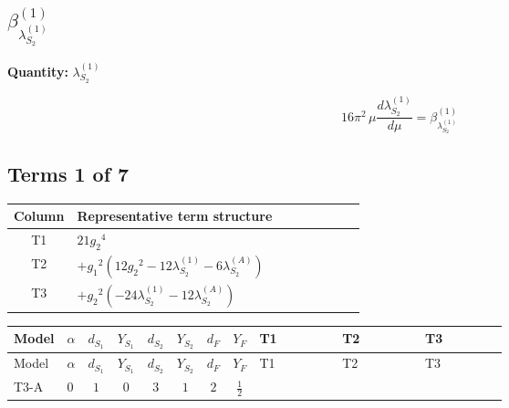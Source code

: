\documentclass[8pt]{article}
\begin{document}
\begin{landscape}
\section*{$\beta_{\lambda_{S_2}^{(1)}}^{(1)}$}
\noindent\textbf{Quantity: }$\lambda_{S_2}^{(1)}$\par\smallskip
\[16\pi^2\,\mu\frac{d \lambda_{S_2}^{(1)}}{d\mu}=\beta_{\lambda_{S_2}^{(1)}}^{(1)}\]
\subsection*{Terms 1 of 7}
\begin{center}
\begin{tabular}{@{}c >{\raggedright\arraybackslash}p{0.82\linewidth}@{}}
\toprule
Column & Representative term structure \\
\midrule
T1 & \(\displaystyle 21 {g_2}^4\) \\
\midrule
T2 & \(\displaystyle +{g_1}^2 \left(12 {g_2}^2-12 {\lambda_{S_2}^{(1)}}-6 {\lambda_{S_2}^{(A)}}\right)\) \\
\midrule
T3 & \(\displaystyle +{g_2}^2 (-24 {\lambda_{S_2}^{(1)}}-12 {\lambda_{S_2}^{(A)}})\) \\
\midrule
\bottomrule
\end{tabular}
\end{center}
\smallskip
\tiny
\begin{longtable}{@{}llcccccc >{\raggedright\arraybackslash}p{0.21\linewidth} >{\raggedright\arraybackslash}p{0.21\linewidth} >{\raggedright\arraybackslash}p{0.21\linewidth}@{}}
\toprule
Model & $\alpha$ & $d_{S_1}$ & $Y_{S_1}$ & $d_{S_2}$ & $Y_{S_2}$ & $d_F$ & $Y_F$ & T1 & T2 & T3 \\
\midrule
\endfirsthead
\toprule
Model & $\alpha$ & $d_{S_1}$ & $Y_{S_1}$ & $d_{S_2}$ & $Y_{S_2}$ & $d_F$ & $Y_F$ & T1 & T2 & T3 \\
\midrule
\endhead
T3-A & $0$ & $1$ & $0$ & $3$ & $1$ & $2$ & $\frac{1}{2}$ & \scriptsize\adjustbox{max width=\linewidth}{$\begin{gathered} 21 {g_2}^4\end{gathered}$} & \scriptsize\adjustbox{max width=\linewidth}{$\begin{gathered} +{g_1}^2 \left(12 {g_2}^2-12 {\lambda_{S_2}^{(1)}}-6 {\lambda_{S_2}^{(A)}}\right)\end{gathered}$} & \scriptsize\adjustbox{max width=\linewidth}{$\begin{gathered} +{g_2}^2 (-24 {\lambda_{S_2}^{(1)}}-12 {\lambda_{S_2}^{(A)}})\end{gathered}$} \\

\end{longtable}
\end{landscape}
\end{document}
